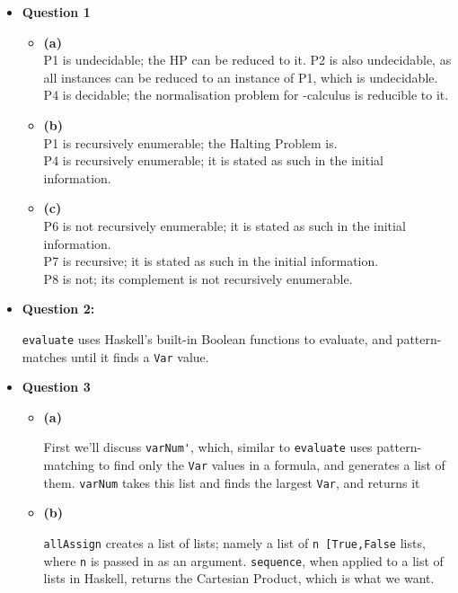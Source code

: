 \documentclass[12pt]{article}
\begin{document}
\maketitle
\begin{itemize}
  \item \textbf{Question 1}
    \begin{itemize}
      \item \textbf{(a)}\\
        P1 is undecidable; the HP can be reduced to it.
        P2 is also undecidable, as all instances can be reduced to an instance of P1, which is undecidable.\\
        P4 is decidable; the normalisation problem for \lambda-calculus is reducible to it.
      \item \textbf{(b)}\\
        P1 is recursively enumerable; the Halting Problem is.\\
        P4 is recursively enumerable; it is stated as such in the initial information.\\
      \item \textbf{(c)}\\
        P6 is not recursively enumerable; it is stated as such in the initial information.\\
        P7 is recursive; it is stated as such in the initial information.\\
        P8 is not; its complement is not recursively enumerable.\\
    \end{itemize}

    \pagebreak
  \item \textbf{Question 2:}
    
    \verb|evaluate| uses Haskell's built-in Boolean functions to evaluate, and pattern-matches until it finds a \verb|Var|
    value.

    \pagebreak
  \item \textbf{Question 3}
    \begin{itemize}
      \item \textbf{(a)}
        
        First we'll discuss \verb|varNum'|, which, similar to \verb|evaluate| uses pattern-matching to find only the
        \verb|Var| values in a formula, and generates a list of them. \verb|varNum| takes this list and finds the largest
        \verb|Var|, and returns it

      \item \textbf{(b)}
        
        \verb|allAssign| creates a list of lists; namely a list of \verb|n [True,False| lists, where \verb|n| is passed in as
        an argument. \verb|sequence|, when applied to a list of lists in Haskell, returns the Cartesian Product, which is what
        we want.


\end{itemize}
\end{itemize}
\end{document}
